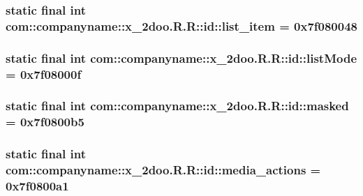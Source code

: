 \hypertarget{classcom_1_1companyname_1_1x__2doo_1_1_r_1_1id_15812ce5961d72596f771807776c0bbc}{
\subsubsection[{list\_\-item}]{\setlength{\rightskip}{0pt plus 5cm}static final int com::companyname::x\_\-2doo.R.R::id::list\_\-item = 0x7f080048}}
\label{classcom_1_1companyname_1_1x__2doo_1_1_r_1_1id_15812ce5961d72596f771807776c0bbc}


\hypertarget{classcom_1_1companyname_1_1x__2doo_1_1_r_1_1id_ab2d0b363071cd9759b5d3031ca3720e}{
\subsubsection[{listMode}]{\setlength{\rightskip}{0pt plus 5cm}static final int com::companyname::x\_\-2doo.R.R::id::listMode = 0x7f08000f}}
\label{classcom_1_1companyname_1_1x__2doo_1_1_r_1_1id_ab2d0b363071cd9759b5d3031ca3720e}


\hypertarget{classcom_1_1companyname_1_1x__2doo_1_1_r_1_1id_8f456777011b2d3cca2b0058b4e2ad7a}{
\subsubsection[{masked}]{\setlength{\rightskip}{0pt plus 5cm}static final int com::companyname::x\_\-2doo.R.R::id::masked = 0x7f0800b5}}
\label{classcom_1_1companyname_1_1x__2doo_1_1_r_1_1id_8f456777011b2d3cca2b0058b4e2ad7a}


\hypertarget{classcom_1_1companyname_1_1x__2doo_1_1_r_1_1id_18a0ba4506826a32884e52a099afe81a}{
\subsubsection[{media\_\-actions}]{\setlength{\rightskip}{0pt plus 5cm}static final int com::companyname::x\_\-2doo.R.R::id::media\_\-actions = 0x7f0800a1}}
\label{classcom_1_1companyname_1_1x__2doo_1_1_r_1_1id_18a0ba4506826a32884e52a099afe81a}


